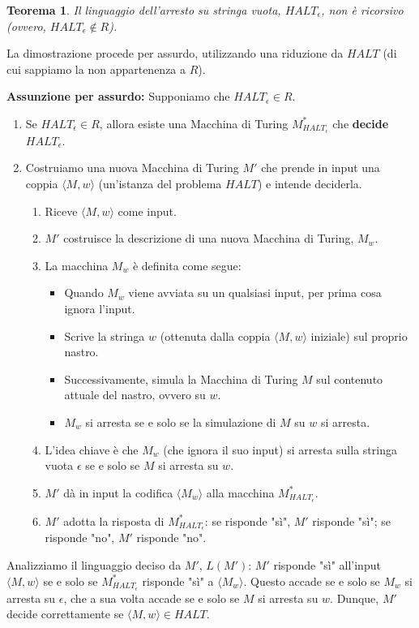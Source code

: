 \documentclass[a4paper]{article}
\makeatletter
\newtheorem{theorem}{Teorema}[section] %
\renewenvironment{proof}[1][\proofname]{\par
  \pushQED{\qed}%
  \normalfont \topsep6\p@\@plus6\p@\relax
  \trivlist
  \item[\hskip\labelsep
        \bfseries
    #1\@addpunct{.}]\ignorespaces
}{%
  \popQED\endtrivlist\@endpefalse
}
\makeatother
\begin{document}
\begin{theorem}
Il linguaggio dell'arresto su stringa vuota, $HALT_\epsilon$, non è ricorsivo (ovvero, $HALT_\epsilon \notin R$).
\end{theorem}
\begin{proof}
La dimostrazione procede per assurdo, utilizzando una riduzione da $HALT$ (di cui sappiamo la non appartenenza a $R$).

\textbf{Assunzione per assurdo:} Supponiamo che $HALT_\epsilon \in R$.
\begin{enumerate}
    \item Se $HALT_\epsilon \in R$, allora esiste una Macchina di Turing $M_{HALT_\epsilon}^*$ che \textbf{decide} $HALT_\epsilon$.
    \item Costruiamo una nuova Macchina di Turing $M'$ che prende in input una coppia $\langle M, w \rangle$ (un'istanza del problema $HALT$) e intende deciderla.
    \begin{enumerate}
        \item Riceve $\langle M, w \rangle$ come input.
        \item $M'$ costruisce la descrizione di una nuova Macchina di Turing, $M_{w}$.
        \item La macchina $M_w$ è definita come segue:
        \begin{itemize}
            \item Quando $M_w$ viene avviata su un qualsiasi input, per prima cosa ignora l'input.
            \item Scrive la stringa $w$ (ottenuta dalla coppia $\langle M, w \rangle$ iniziale) sul proprio nastro.
            \item Successivamente, simula la Macchina di Turing $M$ sul contenuto attuale del nastro, ovvero su $w$.
            \item $M_w$ si arresta se e solo se la simulazione di $M$ su $w$ si arresta.
        \end{itemize}
        \item L'idea chiave è che $M_w$ (che ignora il suo input) si arresta sulla stringa vuota $\epsilon$ se e solo se $M$ si arresta su $w$.
        \item $M'$ dà in input la codifica $\langle M_w \rangle$ alla macchina $M_{HALT_\epsilon}^*$.
        \item $M'$ adotta la risposta di $M_{HALT_\epsilon}^*$: se risponde "sì", $M'$ risponde "sì"; se risponde "no", $M'$ risponde "no".
    \end{enumerate}
\end{enumerate}
Analizziamo il linguaggio deciso da $M'$, $L(M')$:
$M'$ risponde "sì" all'input $\langle M, w \rangle$ se e solo se $M_{HALT_\epsilon}^*$ risponde "sì" a $\langle M_w \rangle$. Questo accade se e solo se $M_w$ si arresta su $\epsilon$, che a sua volta accade se e solo se $M$ si arresta su $w$.
Dunque, $M'$ decide correttamente se $\langle M, w \rangle \in HALT$.


\end{proof}
\end{document}
